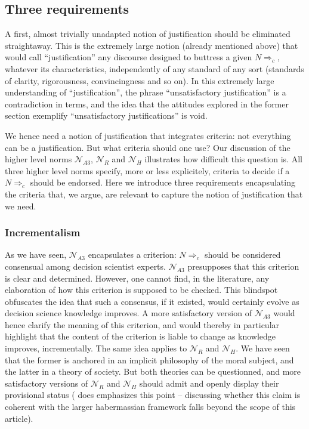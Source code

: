 \documentclass[preprint, french, english, 11pt, authoryear]{elsarticle}%
\begin{document}
\subsection{Three requirements}
A first, almost trivially unadapted notion of justification should be eliminated straightaway. This is the extremely large notion (already mentioned above) that would call ``justification'' any discourse designed to buttress a given $N⇒_c$, whatever its characteristics, independently of any standard of any sort (standards of clarity, rigorousness, convincingness and so on). In this extremely large understanding of ``justification'', the phrase ``unsatisfactory justification'' is a contradiction in terms, and the idea that the attitudes explored in the former section exemplify ``unsatisfactory justifications'' is void.

We hence need a notion of justification that integrates criteria: not everything can be a justification. But what criteria should one use? Our discussion of the higher level norms $\mathscr{N}_{A3}$, $\mathscr{N}_{R}$ and $\mathscr{N}_{H}$ illustrates how difficult this question is. All three higher level norms specify, more or less explicitely, criteria to decide if a $N⇒_c$ should be endorsed. Here we introduce three requirements encapsulating the criteria that, we argue, are relevant to capture the notion of justification that we need.

\subsubsection{Incrementalism}
As we have seen, $\mathscr{N}_{A3}$ encapsulates a criterion: $N⇒_c$ should be considered consensual among decision scientist experts. $\mathscr{N}_{A3}$ presupposes that this criterion is clear and determined. However, one cannot find, in the literature, any elaboration of how this criterion is supposed to be checked. This blindspot obfuscates the idea that such a consensus, if it existed, would certainly evolve as decision science knowledge improves. A more satisfactory version of $\mathscr{N}_{A3}$ would hence clarify the meaning of this criterion, and would thereby in particular highlight that the content of the criterion is liable to change as knowledge improves, incrementally. The same idea applies to $\mathscr{N}_{R}$ and $\mathscr{N}_{H}$. We have seen that the former is anchored in an implicit philosophy of the moral subject, and the latter in a theory of society. But both theories can be questionned, and more satisfactory versions of $\mathscr{N}_{R}$ and $\mathscr{N}_{H}$ should admit and openly display their provisional status (\cite{habermas_moralbewustsein_1983} does emphasizes this point -- discussing whether this claim is coherent with the larger habermassian framework falls beyond the scope of this article).
\end{document}
